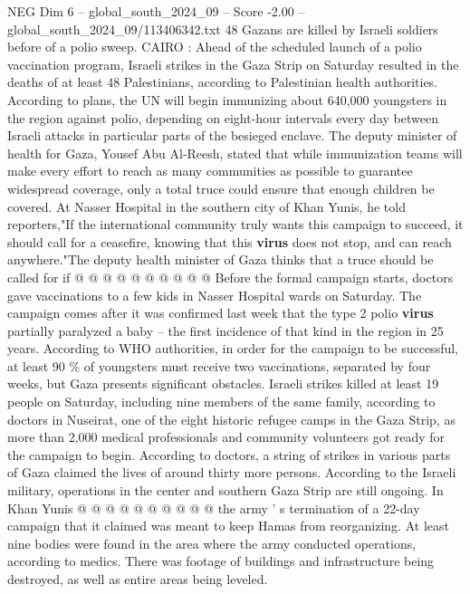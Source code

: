 \begin{textsample}{NEG Dim 6 – global\_south\_2024\_09 – Score -2.00 – global\_south\_2024\_09/113406342.txt}  \label{ex:f6_neg_009}
48 Gazans are killed by Israeli soldiers before of a polio sweep.
CAIRO : Ahead of the scheduled launch of a polio vaccination program, Israeli strikes in the Gaza Strip on Saturday resulted in the deaths of at least 48 Palestinians, according to Palestinian health authorities.
According to plans, the UN will begin immunizing about 640,000 youngsters in the region against polio, depending on eight-hour intervals every day between Israeli attacks in particular parts of the besieged enclave.
The deputy minister of health for Gaza, Yousef Abu Al-Reesh, stated that while immunization teams will make every effort to reach as many communities as possible to guarantee widespread coverage, only a total truce could ensure that enough children be covered.
At Nasser Hospital in the southern city of Khan Yunis, he told reporters,"If the international community truly wants this campaign to succeed, it should call for a ceasefire, knowing that this \textbf{virus} does not stop, and can reach anywhere."The deputy health minister of Gaza thinks that a truce should be called for if @ @ @ @ @ @ @ @ @ @ Before the formal campaign starts, doctors gave vaccinations to a few kids in Nasser Hospital wards on Saturday.
The campaign comes after it was confirmed last week that the type 2 polio \textbf{virus} partially paralyzed a baby -- the first incidence of that kind in the region in 25 years.
According to WHO authorities, in order for the campaign to be successful, at least 90 \% of youngsters must receive two vaccinations, separated by four weeks, but Gaza presents significant obstacles.
Israeli strikes killed at least 19 people on Saturday, including nine members of the same family, according to doctors in Nuseirat, one of the eight historic refugee camps in the Gaza Strip, as more than 2,000 medical professionals and community volunteers got ready for the campaign to begin.
According to doctors, a string of strikes in various parts of Gaza claimed the lives of around thirty more persons.
According to the Israeli military, operations in the center and southern Gaza Strip are still ongoing.
In Khan Yunis @ @ @ @ @ @ @ @ @ @ the army ' s termination of a 22-day campaign that it claimed was meant to keep Hamas from reorganizing.
At least nine bodies were found in the area where the army conducted operations, according to medics.
There was footage of buildings and infrastructure being destroyed, as well as entire areas being leveled.

\end{textsample}
